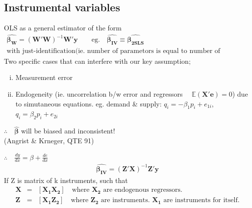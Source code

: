 \subsection{Instrumental variables}
OLS as a general estimator of the form
\begin{eqnarray*}
\boldsymbol{\hat{\beta_{W}}}=(\boldsymbol{W'W})^{-1}\boldsymbol{W'y}\qquad\text{eg.}\quad\boldsymbol{\hat{\beta_{IV}}}\equiv\boldsymbol{\hat{\beta_{2SLS}}}\\
\text{with just-identification(ie. number of parametors is equal to number of instruments)}
\end{eqnarray*}
Two specific cases that can interfere with our key assumption;
\begin{enumerate}[(i)]
\item Measurement error
\item Endogeneity (ie. uncorrelation b/w error and regressors $\quad\mathbb{E}(\boldsymbol{X'e})=0$) due to simutaneous equations. eg. demand \& supply: $q_{i}=-\beta_{1}p_{i}+e_{1i}$, $q_{i}=\beta_{2}p_{i}+e_{2i}$
\end{enumerate}
$\therefore\quad\boldsymbol{\hat{\beta}}$ will be biased and inconsistent!\\
(Angrist \& Krneger, QTE 91)\\
$\therefore\quad\frac{dy}{dx}=\beta + \frac{de}{dx}$
\begin{eqnarray*}
\boldsymbol{\hat{\beta_{IV}}}=(\boldsymbol{Z'X})^{-1}\boldsymbol{Z'y}
\end{eqnarray*}
If Z is matrix of k instruments, such that
\begin{eqnarray*}
\boldsymbol{X} &=& [\boldsymbol{X_{1}X_{2}}]\quad\text{where }\boldsymbol{X_{2}}\text{ are endogenous regressors.}\\
\boldsymbol{Z} &=& [\boldsymbol{X_{1}Z_{2}}]\quad\text{where }\boldsymbol{Z_{2}}\text{ are instruments. }\boldsymbol{X_{1}}\text{ are instruments for itself.}
\end{eqnarray*}
